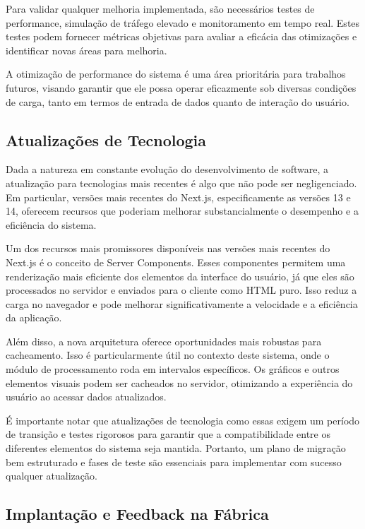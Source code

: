 Para validar qualquer melhoria implementada, são necessários testes de performance, simulação de tráfego elevado e monitoramento em tempo real. Estes testes podem fornecer métricas objetivas para avaliar a eficácia das otimizações e identificar novas áreas para melhoria.

A otimização de performance do sistema é uma área prioritária para trabalhos futuros, visando garantir que ele possa operar eficazmente sob diversas condições de carga, tanto em termos de entrada de dados quanto de interação do usuário.

\subsection{Atualizações de Tecnologia}

Dada a natureza em constante evolução do desenvolvimento de software, a atualização para tecnologias mais recentes é algo que não pode ser negligenciado. Em particular, versões mais recentes do Next.js, especificamente as versões 13 e 14, oferecem recursos que poderiam melhorar substancialmente o desempenho e a eficiência do sistema.

Um dos recursos mais promissores disponíveis nas versões mais recentes do Next.js é o conceito de Server Components. Esses componentes permitem uma renderização mais eficiente dos elementos da interface do usuário, já que eles são processados no servidor e enviados para o cliente como HTML puro. Isso reduz a carga no navegador e pode melhorar significativamente a velocidade e a eficiência da aplicação.

Além disso, a nova arquitetura oferece oportunidades mais robustas para cacheamento. Isso é particularmente útil no contexto deste sistema, onde o módulo de processamento roda em intervalos específicos. Os gráficos e outros elementos visuais podem ser cacheados no servidor, otimizando a experiência do usuário ao acessar dados atualizados.

É importante notar que atualizações de tecnologia como essas exigem um período de transição e testes rigorosos para garantir que a compatibilidade entre os diferentes elementos do sistema seja mantida. Portanto, um plano de migração bem estruturado e fases de teste são essenciais para implementar com sucesso qualquer atualização.


\subsection{Implantação e Feedback na Fábrica}

